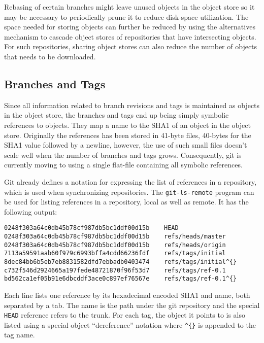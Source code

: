 Rebasing of certain branches might leave unused objects in the object
store so it may be necessary to periodically prune it to reduce
disk-space utilization. The space needed for storing objects can
further be reduced by using the alternatives mechanism to cascade
object stores of repositories that have intersecting objects. For such
repositories, sharing object stores can also reduce the number of
objects that needs to be downloaded. 

%

\subsection{Branches and Tags}
\label{sec:branch-tag}

Since all information related to branch revisions and tags is
maintained as objects in the object store, the branches and tags end
up being simply symbolic references to objects. They map a name to the
SHA1 of an object in the object store. Originally the references has
been stored in 41-byte files, 40-bytes for the SHA1 value followed by
a newline, however, the use of such small files doesn't scale well
when the number of branches and tags grows. Consequently, git is
currently moving to using a single flat-file containing all symbolic
references.

Git already defines a notation for expressing the list of references
in a repository, which is used when synchronizing repositories.  The
\texttt{git-ls-remote} program can be used for listing references in a
repository, local as well as remote. It has the following output:

\begin{verbatim}
0248f303a64c0db45b78cf987db5bc1ddf00d15b	HEAD
0248f303a64c0db45b78cf987db5bc1ddf00d15b	refs/heads/master
0248f303a64c0db45b78cf987db5bc1ddf00d15b	refs/heads/origin
7113a59591aab60f979c6993bffa4cdd66236fdf	refs/tags/initial
8dec84bb6b5eb7eb8831582dfd7ebbadb0403474	refs/tags/initial^{}
c732f546d2924665a197fede48721870f96f53d7	refs/tags/ref-0.1
bd562ca1ef05b91e6dbcddf3ace0c897ef76567e	refs/tags/ref-0.1^{}
\end{verbatim}

Each line lists one reference by its hexadecimal encoded SHA1 and
name, both separated by a tab. The name is the path under the git
repository and the special \texttt{HEAD} reference refers to the
trunk. For each tag, the object it points to is also listed using a
special object ``dereference'' notation where \texttt{\^}\texttt{\{\}}
is  appended to the tag name.

